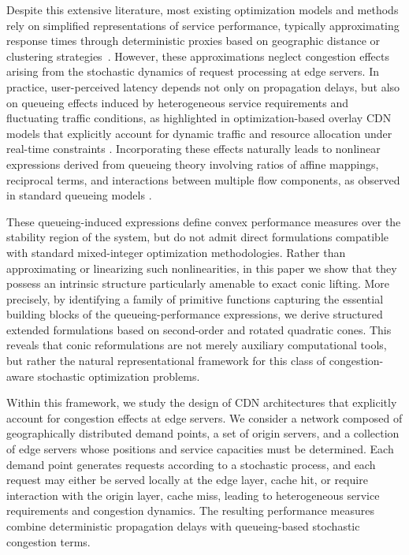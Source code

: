 \documentclass[a4paper,11pt,reqno]{amsart}
\begin{document}
Despite this extensive literature, most existing optimization models and methods rely on simplified representations of service performance, typically approximating response times through deterministic proxies based on geographic distance or clustering strategies~\citep{verma2003cdn,pallis2006insight}. However, these approximations neglect congestion effects arising from the stochastic dynamics of request processing at edge servers. In practice, user-perceived latency depends not only on propagation delays, but also on queueing effects induced by heterogeneous service requirements and fluctuating traffic conditions, as highlighted in optimization-based overlay CDN models that explicitly account for dynamic traffic and resource allocation under real-time constraints \citep{caviglione2011overlay}. Incorporating these effects naturally leads to nonlinear expressions derived from queueing theory involving ratios of affine mappings, reciprocal terms, and interactions between multiple flow components, as observed in standard queueing models \citep{gross2008fundamentals,kleinrock1975queueing}.


These queueing-induced expressions define convex performance measures over the stability region of the system, but do not admit direct formulations compatible with standard mixed-integer optimization methodologies. Rather than approximating or linearizing such nonlinearities, in this paper we show that they possess an intrinsic structure particularly amenable to exact conic lifting. More precisely, by identifying a family of primitive functions capturing the essential building blocks of the queueing-performance expressions, we derive structured extended formulations based on second-order and rotated quadratic cones. This reveals that conic reformulations are not merely auxiliary computational tools, but rather the natural representational framework for this class of congestion-aware stochastic optimization problems.


Within this framework, we study the design of CDN architectures that explicitly account for congestion effects at edge servers. We consider a network composed of geographically distributed demand points, a set of origin servers, and a collection of edge servers whose positions and service capacities must be determined. Each demand point generates requests according to a stochastic process, and each request may either be served locally at the edge layer, cache hit, or require interaction with the origin layer, cache miss, leading to heterogeneous service requirements and congestion dynamics. The resulting performance measures combine deterministic propagation delays with queueing-based stochastic congestion terms.
\end{document}
